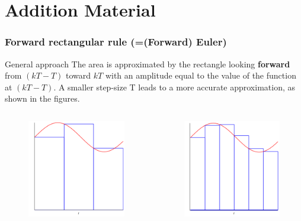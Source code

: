 \section{Addition Material}

\begin{frame}
	\frametitle{Forward rectangular rule (=(Forward) Euler)}
	\begin{block}{General approach}
		The area is approximated by the rectangle looking \textbf{forward} from $(kT - T)$ toward $kT$ with an amplitude equal to the value of the function at $(kT - T)$. A smaller step-size T leads to a more accurate approximation, as shown in the figures.
	\end{block}
	
	\begin{columns}
		\begin{column}{0.5\textwidth}
			\begin{figure}
				\centering
				\includegraphics[width=0.6\linewidth]{Forward1}
			\end{figure}
		\end{column}
		
		\begin{column}{0.5\textwidth}
			\begin{figure}
				\centering
				\includegraphics[width=0.6\linewidth]{Forward2}
			\end{figure}
		\end{column}
	\end{columns}
\end{frame}

